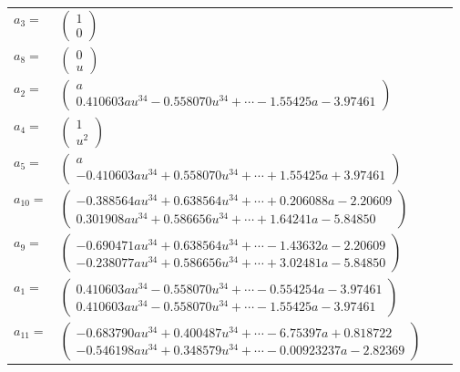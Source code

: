 \documentclass[1p]{elsarticle_modified}
\theoremstyle{definition}
\begin{document}
\begin{tabular}{m{7pt} m{180pt} m{7pt} m{180pt} }
\flushright $a_{3}=$&$\begin{pmatrix}1\\0\end{pmatrix}$ \\
\flushright $a_{8}=$&$\begin{pmatrix}0\\u\end{pmatrix}$ \\
\flushright $a_{2}=$&$\begin{pmatrix}a\\0.410603 a u^{34}-0.558070 u^{34}+\cdots-1.55425 a-3.97461\end{pmatrix}$ \\
\flushright $a_{4}=$&$\begin{pmatrix}1\\u^2\end{pmatrix}$ \\
\flushright $a_{5}=$&$\begin{pmatrix}a\\-0.410603 a u^{34}+0.558070 u^{34}+\cdots+1.55425 a+3.97461\end{pmatrix}$ \\
\flushright $a_{10}=$&$\begin{pmatrix}-0.388564 a u^{34}+0.638564 u^{34}+\cdots+0.206088 a-2.20609\\0.301908 a u^{34}+0.586656 u^{34}+\cdots+1.64241 a-5.84850\end{pmatrix}$ \\
\flushright $a_{9}=$&$\begin{pmatrix}-0.690471 a u^{34}+0.638564 u^{34}+\cdots-1.43632 a-2.20609\\-0.238077 a u^{34}+0.586656 u^{34}+\cdots+3.02481 a-5.84850\end{pmatrix}$ \\
\flushright $a_{1}=$&$\begin{pmatrix}0.410603 a u^{34}-0.558070 u^{34}+\cdots-0.554254 a-3.97461\\0.410603 a u^{34}-0.558070 u^{34}+\cdots-1.55425 a-3.97461\end{pmatrix}$ \\
\flushright $a_{11}=$&$\begin{pmatrix}-0.683790 a u^{34}+0.400487 u^{34}+\cdots-6.75397 a+0.818722\\-0.546198 a u^{34}+0.348579 u^{34}+\cdots-0.00923237 a-2.82369\end{pmatrix}$ \\

\end{tabular}
\end{document}
